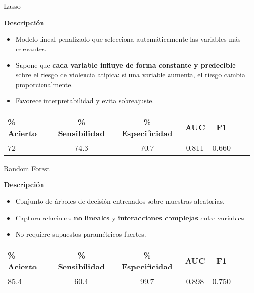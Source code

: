 \begin{frame}{Lasso}
\begin{block}{\textbf{Descripción}}
    \small
            \begin{itemize}
            \item Modelo lineal penalizado que selecciona automáticamente las variables más relevantes.
            \item Supone que \textbf{cada variable influye de forma constante y predecible} sobre el riesgo de violencia atípica: si una variable aumenta, el riesgo cambia proporcionalmente.
            \item Favorece interpretabilidad y evita sobreajuste.
        \end{itemize}
\end{block}
    
    \begin{alertblock}
    \small
    \begin{table}[h!]
    \centering
    \begin{tabular}{lcccccc}
        \toprule
        \% Acierto & \% Sensibilidad & \% Especificidad & AUC &  F1 \\
        \midrule
         72 & 74.3 & 70.7 & 0.811 &  0.660 \\
        \bottomrule
    \end{tabular}
    \end{table}

    \end{alertblock}
\end{frame}




\begin{frame}{Random Forest}
    \small
    \begin{block}{\textbf{Descripción}}
        \begin{itemize}
            \item Conjunto de árboles de decisión entrenados sobre muestras aleatorias.
            \item Captura relaciones \textbf{no lineales} y \textbf{interacciones complejas} entre variables.
            \item No requiere supuestos paramétricos fuertes.

        \end{itemize}
    \end{block}
    \begin{alertblock}
    \small
    \begin{table}[h!]
    \centering
    \begin{tabular}{lcccccc}
        \toprule
        \% Acierto & \% Sensibilidad & \% Especificidad & AUC & F1 \\
        \midrule
         85.4 & 60.4 & 99.7 & 0.898 & 0.750 \\
        \bottomrule
    \end{tabular}
    \end{table}
    \end{alertblock}
\end{frame}